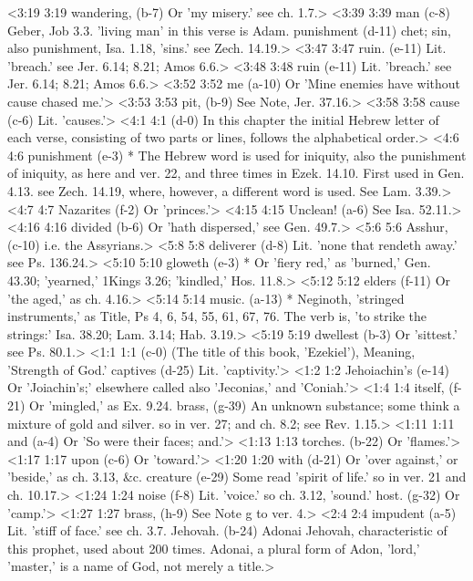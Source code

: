 <3:19 3:19  wandering, (b-7)  Or 'my misery.' see ch. 1.7.>
<3:39 3:39  man (c-8)  Geber, Job 3.3. 'living man' in this verse is Adam.
  punishment (d-11)  chet; sin, also punishment, Isa. 1.18, 'sins.' see Zech. 14.19.>
<3:47 3:47  ruin. (e-11) Lit. 'breach.' see Jer. 6.14; 8.21; Amos 6.6.>
<3:48 3:48  ruin (e-11)  Lit. 'breach.' see Jer. 6.14; 8.21; Amos 6.6.>
<3:52 3:52  me (a-10)  Or 'Mine enemies have without cause chased me.'>
<3:53 3:53  pit, (b-9)  See Note, Jer. 37.16.>
<3:58 3:58  cause (c-6)  Lit. 'causes.'>
<4:1 4:1   (d-0)  In this chapter the initial Hebrew letter of each verse,  consisting of two parts or lines, follows the alphabetical  order.>
<4:6 4:6  punishment (e-3)  * The Hebrew word is used for iniquity, also the punishment  of iniquity, as here and ver. 22, and three times in Ezek. 14.10.  First used in Gen. 4.13. see Zech. 14.19, where,  however, a different word is used. See Lam. 3.39.>
<4:7 4:7  Nazarites (f-2)  Or 'princes.'>
<4:15 4:15  Unclean! (a-6)  See Isa. 52.11.>
<4:16 4:16  divided (b-6)  Or 'hath dispersed,' see Gen. 49.7.>
<5:6 5:6  Asshur, (c-10)  i.e. the Assyrians.>
<5:8 5:8  deliverer (d-8)  Lit. 'none that rendeth away.' see Ps. 136.24.>
<5:10 5:10  gloweth (e-3)  * Or 'fiery red,' as 'burned,' Gen. 43.30; 'yearned,' 1Kings  3.26; 'kindled,' Hos. 11.8.>
<5:12 5:12  elders (f-11)  Or 'the aged,' as ch. 4.16.>
<5:14 5:14  music. (a-13)  * Neginoth, 'stringed instruments,' as Title, Ps 4, 6, 54, 55, 61, 67, 76.  The verb is, 'to strike the strings:' Isa. 38.20; Lam. 3.14; Hab. 3.19.>
<5:19 5:19  dwellest (b-3)  Or 'sittest.' see Ps. 80.1.>
<1:1 1:1   (c-0)  (The title of this book, 'Ezekiel'), Meaning, 'Strength of  God.'
  captives (d-25)  Lit. 'captivity.'>
<1:2 1:2  Jehoiachin's (e-14)  Or 'Joiachin's;' elsewhere called also 'Jeconias,' and  'Coniah.'>
<1:4 1:4  itself, (f-21)  Or 'mingled,' as Ex. 9.24.
  brass, (g-39)  An unknown substance; some think a mixture of gold and  silver. so in ver. 27; and ch. 8.2; see Rev. 1.15.>
<1:11 1:11  and (a-4)  Or 'So were their faces; and.'>
<1:13 1:13  torches. (b-22)  Or 'flames.'>
<1:17 1:17  upon (c-6)  Or 'toward.'>
<1:20 1:20  with (d-21)  Or 'over against,' or 'beside,' as ch. 3.13, &c.
  creature (e-29)  Some read 'spirit of life.' so in ver. 21 and ch. 10.17.>
<1:24 1:24  noise (f-8)  Lit. 'voice.' so ch. 3.12, 'sound.'
  host. (g-32)  Or 'camp.'>
<1:27 1:27  brass, (h-9)  See Note g to ver. 4.>
<2:4 2:4  impudent (a-5)  Lit. 'stiff of face.' see ch. 3.7.
  Jehovah. (b-24)  Adonai Jehovah, characteristic of this prophet, used about  200 times. Adonai, a plural form of Adon, 'lord,' 'master,'  is a name of God, not merely a title.>
